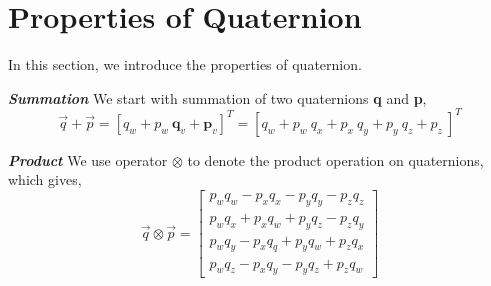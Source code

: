\section{Properties of Quaternion}
\label{sec:prop_of_quat}

In this section, we introduce the properties of quaternion. 

\textbf{\textit{Summation}} We start with summation of two quaternions \textbf{q} and \textbf{p},
\begin{equation}\label{q7}
\vec{q} + \vec{p} = \left[q_w+p_w \ \mathbf{q}_v+\mathbf{p}_v\right]^T = \left[q_w+p_w \ q_x+p_x \ q_y+p_y \ q_z+p_z \ \right]^T
\end{equation}

\textbf{\textit{Product}} We use operator $\otimes$ to denote the product operation on quaternions, which gives,
\begin{equation}\label{q3}
	\vec{q} \otimes \vec{p} = \begin{bmatrix}
							  	p_wq_w-p_xq_x-p_yq_y-p_zq_z \\
							  	p_wq_x+p_xq_w+p_yq_z-p_zq_y \\
							  	p_wq_y-p_xq_q+p_yq_w+p_zq_x \\
							  	p_wq_z-p_xq_y-p_yq_z+p_zq_w 
							  \end{bmatrix}
\end{equation}

